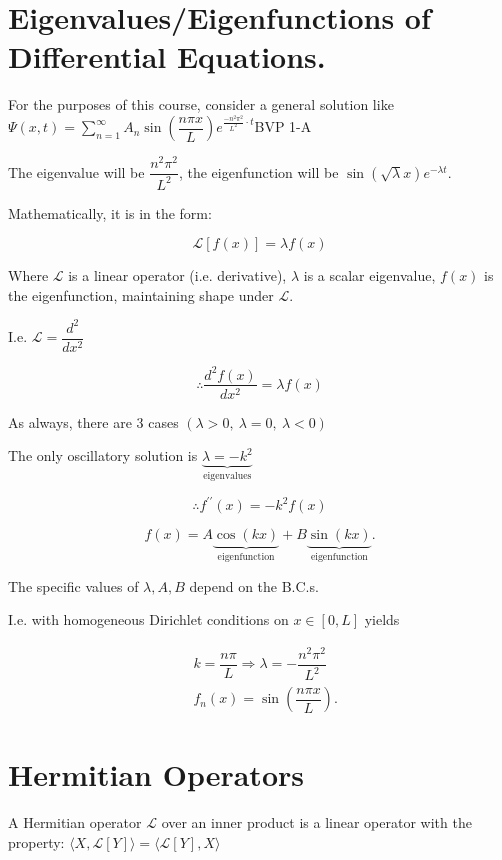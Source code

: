 \documentclass{report}
\begin{document}
\section{Eigenvalues/Eigenfunctions of Differential Equations.}

For the purposes of this course, consider a general solution like $\Psi(x, t)=\sum\limits_{n=1}^{\infty} A_{n} \sin \left(\dfrac{n \pi x}{L}\right) e^{\frac{-n^{2} \pi^{2}}{L^{2}}\cdot t}$\qquad BVP 1-A

The eigenvalue will be $\dfrac{n^{2} \pi^{2}}{L^{2}}$, the eigenfunction will be $\sin (\sqrt{\lambda} x) e^{-\lambda t}$.

Mathematically, it is in the form:

$$
\mathcal{L}[f(x)]=\lambda f(x)
$$

Where $\mathcal{L}$ is a linear operator (i.e. derivative), $\lambda$ is a scalar eigenvalue, $f(x)$ is the eigenfunction, maintaining shape under $\mathcal{L}$.

I.e. $\mathcal{L}=\dfrac{d^{2}}{d x^{2}}$

$$
\therefore \dfrac{d^{2} f(x)}{d x^{2}}=\lambda f(x)
$$

As always, there are 3 cases $(\lambda>0,\ \lambda=0,\ \lambda<0)$

The only oscillatory solution is $\underbrace{\lambda=-k^{2}}_{\text{eigenvalues}}$

$$\therefore f^{\prime \prime}(x)=-k^{2} f(x)$$

$$
f(x)=A\!\underbrace{\cos(kx)}_{\text{eigenfunction}}+B\!\underbrace{\sin(kx)}_{\text{eigenfunction}}.
$$

The specific values of $\lambda, A, B$ depend on the B.C.s.

I.e. with homogeneous Dirichlet conditions on $x \in[0, L]$ yields

$$
\begin{aligned}
& k=\dfrac{n \pi}{L} \Rightarrow \lambda=-\dfrac{n^{2} \pi^{2}}{L^{2}} \\
& f_{n}(x)=\sin \left(\dfrac{n \pi x}{L}\right).
\end{aligned}
$$

\section{Hermitian Operators}

A Hermitian operator $\mathcal{L}$ over an inner product is a linear operator with the property: $\langle X, \mathcal{L}[Y]\rangle=\langle\mathcal{L}[Y], X\rangle$
\end{document}
